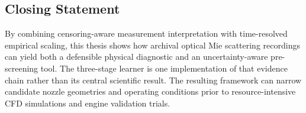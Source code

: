 \subsection{Closing Statement}

By combining censoring-aware measurement interpretation with time-resolved empirical scaling, this thesis shows how archival optical Mie scattering recordings can yield both a defensible physical diagnostic and an uncertainty-aware pre-screening tool. The three-stage learner is one implementation of that evidence chain rather than its central scientific result. The resulting framework can narrow candidate nozzle geometries and operating conditions prior to resource-intensive CFD simulations and engine validation trials.
